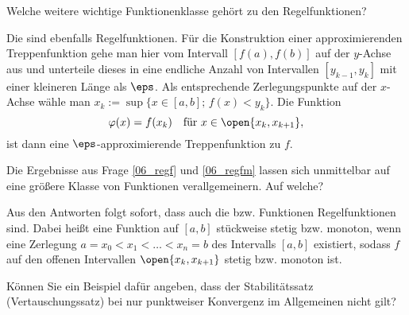 \begin{frage}\label{06_regfm}
Welche weitere wichtige Funktionenklasse 
gehört zu den Regelfunktionen?
\end{frage}

\begin{antwort}
 Die  sind ebenfalls Regelfunktionen.  
Für die Konstruktion einer 
approximierenden Treppenfunktion gehe man hier vom 
Intervall $[f(a),f(b)]$ auf der $y$-Achse aus und  
unterteile dieses in eine endliche Anzahl 
von Intervallen $[y_{k-1},y_k]$ mit einer kleineren Länge 
als $\eps$. Als entsprechende Zerlegungspunkte   
auf der $x$-Achse wähle man 
$x_k := \sup \{ x\in[a,b]; \, f(x)< y_k \}$. Die Funktion 
\[
\varphi( x ) = f(x_k)  \quad\text{für $x\in \open{x_k,x_{k+1}}$},  
\]
ist dann eine $\eps$-approximierende Treppenfunktion zu $f$.
\AntEnd
\end{antwort} 

\begin{frage}
Die Ergebnisse aus Frage \ref{06_regf} und \ref{06_regfm} lassen 
sich unmittelbar auf eine größere Klasse von Funktionen verallgemeinern.  
Auf welche? 
\end{frage}

\begin{antwort}
 
Aus den Antworten folgt sofort, dass auch die 
 bzw. 
 Funktionen 
Regelfunktionen sind. Dabei heißt eine Funktion auf $[a,b]$ 
stückweise stetig bzw. monoton, wenn eine Zerlegung 
$a=x_0 < x_1 < \ldots < x_n=b$ des Intervalls 
$[a,b]$ existiert, sodass 
$f$ auf den offenen Intervallen $\open{x_k,x_{k+1}}$ 
stetig bzw. monoton ist. 
\AntEnd 
\end{antwort}


\begin{frage}\label{06_pkon}
Können Sie ein Beispiel dafür angeben, dass der 
Stabilitätssatz (Vertauschungssatz) bei nur punktweiser Konvergenz im 
Allgemeinen nicht gilt?
\end{frage}

